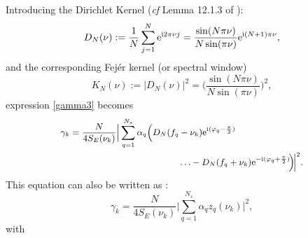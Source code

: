 \documentclass[journal]{IEEEtran}
\begin{document}
{ Introducing the Dirichlet Kernel (\textit{cf} Lemma 12.1.3 of \cite{Li_2014}):\\ }
$$
	D_N(\nu) := \frac{1}{N}  \sum_{j=1}^{N}  \mathrm{e}^{{\rm{i}} 2\pi \nu j} = \frac{\sin(N\pi \nu)}{N\sin(\pi \nu)} \mathrm{e}^{{\rm{i}} (N+1)\pi \nu},
     \label{eq_Dn}
$$
	and the corresponding  Fej\'er kernel (or spectral window)
\begin{equation}
	K_N(\nu) := |D_N(\nu)|^2 =  \Bigg( \frac{\sin(N\pi \nu)}{N\sin(\pi \nu)} \Bigg)^2,
     \label{eq_Kn}
\end{equation}
expression \eqref{gamma3} becomes
{
$$ 
 \small
  \begin{aligned}
 \gamma_k 
	
				&=  \frac{N}{4 S_E(\nu_k)} \Big| \sum_{q=1}^{N_s}  \alpha_q \Big( D_N(f_q -\nu_k)  \mathrm{e}^{{\rm{i}} (\varphi_q-\frac{\pi}{2})} \\
				&~~~~~~~~~~~~~~~~~~~~~~~~~~~~~~~~~~~~\hdots  - D_N(f_q +\nu_k) \mathrm{e}^{-{\rm{i}} (\varphi_q+\frac{\pi}{2})}\! \Big)\! \Big|^2. \\
 \end{aligned}
 $$
 }
 This equation can also be written as :
\begin{equation} 
	 \gamma_k =  \frac{N}{4 S_E(\nu_k)} \Big| \sum_{q=1}^{N_s}  \alpha_q z_q(\nu_k) \Big|^2,
	 \label{gamma2}
 \end{equation} 
 with
  
\end{document}
